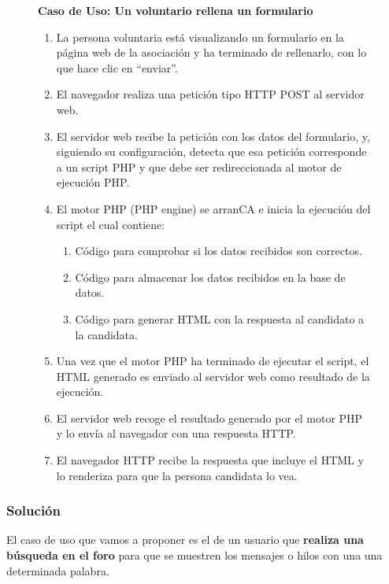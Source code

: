 \begin{figure}[H]
    \begin{tcolorbox}[sharp corners, colback=yellow!30, colframe=white!20]
     \textbf{Caso de Uso: Un voluntario rellena un formulario}
     \vspace{3ex}
     \begin{enumerate}
         \item La persona voluntaria está visualizando un formulario en la página web de la asociación y ha terminado de rellenarlo, con lo que hace clic en ``enviar''.
         \item El navegador realiza una petición tipo HTTP POST al servidor web.
         \item El servidor web recibe la petición con los datos del formulario, y, siguiendo su configuración, detecta que esa petición corresponde a un script PHP y que debe ser redireccionada al motor de ejecución PHP.
         \item El motor PHP (PHP engine) se arranCA e inicia la ejecución del script el cual contiene:
         \begin{enumerate}
             \item Código para comprobar si los datos recibidos son correctos.
             \item Código para almacenar los datos recibidos en la base de datos.
             \item Código para generar HTML con la respuesta al candidato a la candidata.
         \end{enumerate}
         \item Una vez que el motor PHP ha terminado de ejecutar el script, el HTML generado es enviado al servidor web como resultado de la ejecución.
         \item El servidor web recoge el resultado generado por el motor PHP y lo envía al navegador con una respuesta HTTP.
         \item El navegador HTTP recibe la respuesta que incluye el HTML y lo renderiza para que la persona candidata lo vea.
     \end{enumerate}
    \end{tcolorbox}
\end{figure}

\subsubsection{Solución}
El caso de uso que vamos a proponer es el de un usuario que \textbf{realiza una búsqueda en el foro} para que se muestren los mensajes o hilos con una una determinada palabra.

